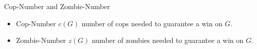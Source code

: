 \begin{frame}{Cop-Number and Zombie-Number}
\begin{itemize}
  \item<1-> Cop-Number $c(G)$ number of cops needed to guarantee a win on $G$.
  \item<2-> Zombie-Number $z(G)$ number of zombies needed to guarantee a win on $G$.
\end{itemize}
\end{frame}
